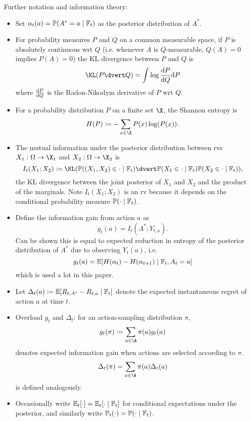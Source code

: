 \documentclass[11pt, openany]{book}
\begin{document}
Further notation and information theory:
\begin{itemize}
    \item Set $\alpha_t(a) = \mathbb{P}(A^* = a\mid \mathbb{F}_t)$ as the posterior distribution of $A^*$.
    \item For probability measures $P$ and $Q$ on a common measurable space, if $P$ is absolutely continuous wrt $Q$ (i.e. whenever $A$ is $Q$-measurable, $Q(A)=0$ implies $P(A)=0$) the KL divergence between $P$ and $Q$ is
        \[
            \KL(P\dvert Q) = \int \log \frac{\diff P}{\diff Q} \diff P
        \]
        where $\frac{\mathrm{d} P}{\mathrm{d} Q}$ is the Radon-Nikodym derivative of $P$ wrt $Q$.
    \item For a probability distribution $P$ on a finite set $\X$, the Shannon entropy is
        \[
            H(P) \defeq -\sum_{x\in\X} P(x)\log(P(x)).
        \]
    \item The mutual information under the posterior distribution between rvs $X_1:\Omega\to\X_1$ and $X_2:\Omega\to\X_2$ is
        \[
            I_t(X_1;X_2) \defeq \KL(\P((X_1,X_2)\in\cdot \given \F_t) \dvert \P(X_1\in\cdot \given \F_t) \P(X_2\in\cdot\given \F_t)),
        \]
        the KL divergence between the joint posterior of $X_1$ and $X_2$ and the product of the marginals. Note $I_t(X_1;X_2)$ is an rv because it depends on the conditional probability measure $\mathbb{P}(\cdot\mid\mathbb{F}_t)$.
    \item Define the information gain from action $a$ as
        \[
            g_t(a) = I_t(A^*;Y_{t,a}).
        \]
        Can be shown this is equal to expected reduction in entropy of the posterior distribution of $A^*$ due to observing $Y_t(a)$, i.e.
        \[
            g_t(a) = \mathbb{E}[H(\alpha_t) - H(\alpha_{t+1}) \mid \mathbb{F}_t, A_t=a]
        \]
        which is used a lot in this paper.
    \item Let $\Delta_t(a) \coloneq \mathbb{E}[R_{t,A^*} - R_{t,a} \mid \mathbb{F}_t]$ denote the expected instantaneous regret of action $a$ at time $t$.
    \item Overload $g_t$ and $\Delta_t$: for an action-sampling distribution $\pi$,
        \[
            g_t(\pi) \defeq \sum_{a\in\A} \pi(a)g_t(a)
        \]
        denotes expected information gain when actions are selected according to $\pi$. 
        \[
            \Delta_t(\pi) = \sum_{a\in\A} \pi(a)\Delta_t(a)
        \]
        is defined analogously.
    \item Occasionally write $\mathbb{E}_t[\cdot] = \mathbb{E}_t[\cdot\mid\mathbb{F}_t]$ for conditional expectations under the posterior, and similarly write $\mathbb{P}_t(\cdot) = \mathbb{P}(\cdot\mid\mathbb{F}_t)$.
\end{itemize}
\end{document}
